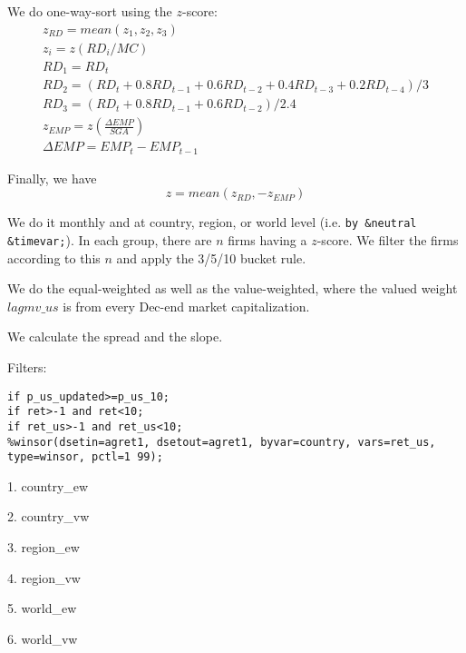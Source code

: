 





\thispagestyle{fancy}

\newcommand{\code}{\texttt}
\newcommand*{\Commonpath}{20190102/one-way}


We do one-way-sort using the $z$-score:
$$
\begin{aligned}
& z_{RD} = mean(z_1, z_2, z_3) \\
& z_i = z(RD_i/MC) \\
& RD_1 = RD_t \\
& RD_2 = (RD_t + 0.8RD_{t-1} + 0.6RD_{t-2} + 0.4RD_{t-3} + 0.2RD_{t-4})/3 \\
& RD_3 = (RD_t + 0.8RD_{t-1} + 0.6RD_{t-2})/2.4 
& \\
& z_{EMP} = z(\frac{\Delta EMP}{SGA}) \\
& \Delta EMP = EMP_t - EMP_{t-1}
\end{aligned}
$$

Finally, we have
$$
z = mean(z_{RD}, -z_{EMP})
$$


We do it monthly and at country, region, or world level (i.e. \code{by \&neutral \&timevar;}). In each group, there are $n$ firms having a $z$-score. We filter the firms according to this $n$ and apply the 3/5/10 bucket rule.

We do the equal-weighted as well as the value-weighted, where the valued weight $lagmv\_us$ is from every Dec-end market capitalization.

We calculate the spread and the slope.

Filters:

\code{if p\_us\_updated>=p\_us\_10;} \\
\code{if ret>-1 and ret<10;} \\
\code{if ret\_us>-1 and ret\_us<10;} \\
\code{\%winsor(dsetin=agret1, dsetout=agret1, byvar=country, vars=ret\_us, type=winsor, pctl=1 99);}


1. country\_ew


2. country\_vw


3. region\_ew


4. region\_vw


5. world\_ew


6. world\_vw




